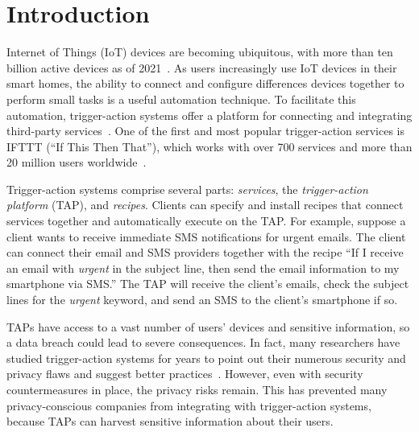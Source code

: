 \section{Introduction}
\label{sec:intro}

Internet of Things (IoT) devices are becoming ubiquitous, with more than ten
billion active devices as of 2021~\cite{DBLP:webpage/Bojan/IoTstats}. As users
increasingly use IoT devices in their smart homes, the ability to connect and
configure differences devices together to perform small tasks is a useful
automation technique. To facilitate this automation, trigger-action systems
offer a platform for connecting and integrating third-party
services~\cite{DBLP:journals/access/XuZZCDG19, DBLP:conf/chi/UrHBLMPSL16}. One
of the first and most popular trigger-action services is IFTTT (``If This Then
That''), which works with over 700 services and more than 20 million users
worldwide~\cite{ifttt-website, DBLP:conf/sp/ChenCWSCF21}.

Trigger-action systems comprise several parts: \emph{services}, the
\emph{trigger-action platform} (TAP), and \emph{recipes}. Clients can specify
and install recipes that connect services together and automatically execute on
the TAP. For example, suppose a client wants to receive immediate SMS
notifications for urgent emails. The client can connect their email and SMS
providers together with the recipe ``If I receive an email with \emph{urgent} in
the subject line, then send the email information to my smartphone via SMS.''
The TAP will receive the client's emails, check the subject lines for the
\emph{urgent} keyword, and send an SMS to the client's smartphone if so.
%

TAPs have access to a vast number of users' devices and sensitive information,
so a data breach could lead to severe consequences. In fact, many researchers
have studied trigger-action systems for years to point out their numerous
security and privacy flaws and suggest better
practices~\cite{DBLP:conf/sp/ChenCWSCF21, DBLP:journals/corr/abs-2009-12447,
  DBLP:conf/imc/MiQZW17, DBLP:journals/corr/FernandesRJP17,
  DBLP:conf/www/SurbatovichABDJ17, DBLP:journals/access/XuZZCDG19}. However,
even with security countermeasures in place, the privacy risks remain. This has
prevented many privacy-conscious companies from integrating with trigger-action
systems, because TAPs can harvest sensitive information about their users.

